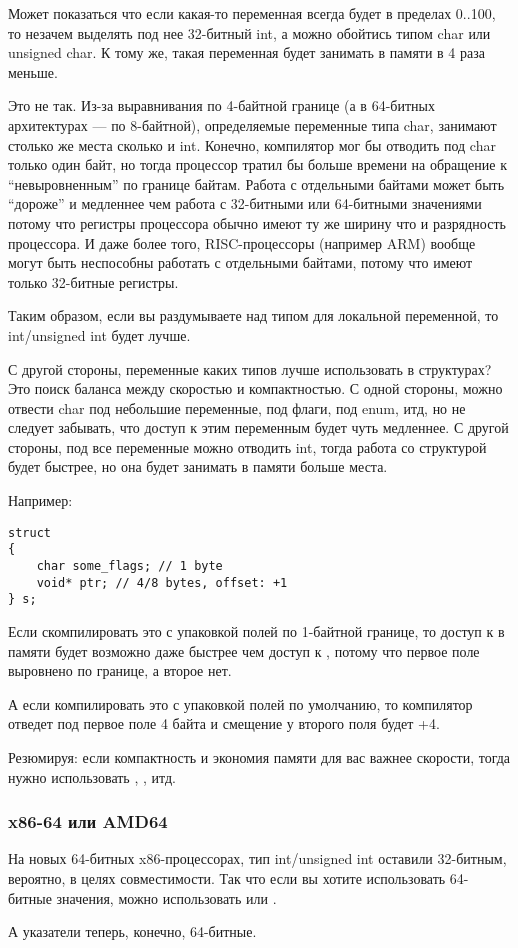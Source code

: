 Может показаться что если какая-то переменная всегда будет в пределах 0..100, то незачем выделять под нее 32-битный
int, а можно обойтись типом char или unsigned char. К тому же, такая переменная будет занимать в памяти в 4 раза меньше.

Это не так. Из-за выравнивания по 4-байтной границе (а в 64-битных архитектурах --- по 8-байтной), 
определяемые переменные типа char, занимают столько же места сколько и int. Конечно, компилятор мог бы отводить под
char только один байт, но тогда процессор тратил бы больше времени на обращение к ``невыровненным'' по границе байтам.
Работа с отдельными байтами может быть ``дороже'' и медленнее чем работа с 32-битными или 64-битными 
значениями потому что
регистры процессора обычно имеют ту же ширину что и разрядность процессора. И даже более того, RISC-процессоры 
(например ARM) вообще могут быть неспособны работать с отдельными байтами, потому что имеют только 32-битные регистры.

Таким образом, если вы раздумываете над типом для локальной переменной, то int/unsigned int будет лучше.

С другой стороны, переменные каких типов лучше использовать в структурах? Это поиск баланса между скоростью
и компактностью. С одной стороны, можно отвести char под небольшие переменные, под флаги, под enum, итд, но не следует
забывать, что доступ к этим переменным будет чуть медленнее. С другой стороны, под все переменные можно отводить
int, тогда работа со структурой будет быстрее, но она будет занимать в памяти больше места.

Например:

\begin{lstlisting}
struct
{
	char some_flags; // 1 byte
	void* ptr; // 4/8 bytes, offset: +1
} s;
\end{lstlisting}

Если скомпилировать это с упаковкой полей по 1-байтной границе, 
то доступ к  в памяти будет возможно даже быстрее чем доступ к , потому что первое поле
выровнено по границе, а второе нет.

А если компилировать это с упаковкой полей по умолчанию, то компилятор отведет под первое поле 4 байта и смещение
у второго поля будет +4.

Резюмируя: если компактность и экономия памяти для вас важнее скорости, тогда нужно использовать 
, , итд.

\subsubsection{x86-64 или AMD64}

На новых 64-битных x86-процессорах, тип int/unsigned int оставили 32-битным, вероятно, в целях совместимости.
Так что если вы хотите использовать 64-битные значения, можно использовать  или .

А указатели теперь, конечно, 64-битные.
